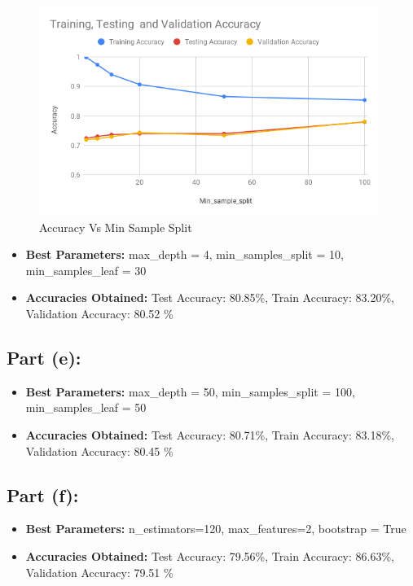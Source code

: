 \documentclass[a4 paper]{article}
\begin{document}
\begin{figure}[ht!]
	\centering %
	\includegraphics[width=110mm]{./chart/DT_d3.png}
	\caption{Accuracy Vs Min Sample Split}
\end{figure}

\begin{itemize}
\item \textbf{Best Parameters:}
max\_depth = 4, min\_samples\_split = 10, min\_samples\_leaf = 30
\item \textbf{Accuracies Obtained:}  Test Accuracy: 80.85\%, Train Accuracy: 83.20\%, Validation Accuracy: 80.52 \%
\end{itemize}

 
\subsection*{Part (e):}

\begin{itemize}
\item \textbf{Best Parameters:}
max\_depth = 50, min\_samples\_split = 100, min\_samples\_leaf = 50
\item \textbf{Accuracies Obtained:}  Test Accuracy: 80.71\%, Train Accuracy: 83.18\%, Validation Accuracy: 80.45 \%
\end{itemize}

\subsection*{Part (f):}

\begin{itemize}
\item \textbf{Best Parameters:}
n\_estimators=120,  max\_features=2, bootstrap = True
\item \textbf{Accuracies Obtained:}  Test Accuracy: 79.56\%, Train Accuracy: 86.63\%, Validation Accuracy: 79.51 \%	
\end{itemize}
\end{document}
